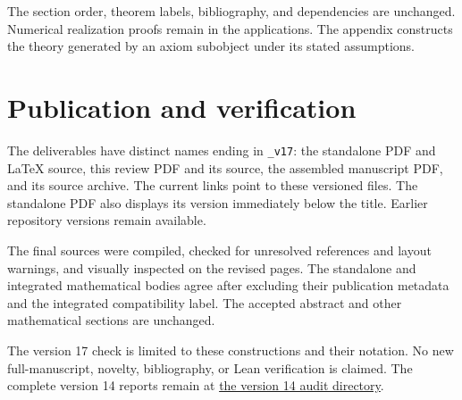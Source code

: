 \documentclass[10pt]{article}
\begin{document}
The section order, theorem labels, bibliography, and dependencies are unchanged.
Numerical realization proofs remain in the applications. The appendix constructs
the theory generated by an axiom subobject under its stated assumptions.

\section*{Publication and verification}
The deliverables have distinct names ending in \texttt{\_v17}: the standalone
PDF and LaTeX source, this review PDF and its source, the assembled manuscript
PDF, and its source archive. The current links point to these versioned files.
The standalone PDF also displays its version immediately below the title.
Earlier repository versions remain available.

The final sources were compiled, checked for unresolved references and layout
warnings, and visually inspected on the revised pages. The standalone and
integrated mathematical bodies agree after excluding their publication metadata
and the integrated compatibility label. The accepted abstract and other
mathematical sections are unchanged.

The version 17 check is limited to these constructions and their notation. No new full-manuscript, novelty,
bibliography, or Lean verification is claimed. The complete version 14 reports
remain at
\href{https://github.com/flengyel/CategoricalEssentialIncompleteness/tree/main/Audit/2026-10-31-appendix-v14}{the version 14 audit directory}.
\end{document}
